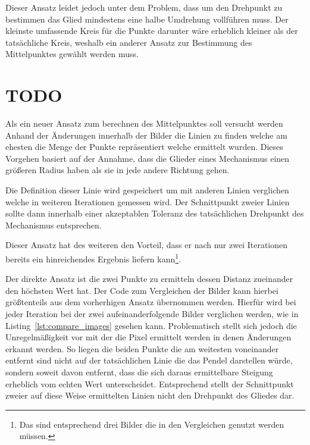 Dieser Ansatz leidet jedoch unter dem Problem, dass um den Drehpunkt zu bestimmen das Glied mindestens eine halbe Umdrehung vollführen muss.
Der kleinste umfassende Kreis für die Punkte darunter wäre erheblich kleiner als der tatsächliche Kreis, weshalb ein anderer Ansatz zur Bestimmung des Mittelpunktes gewählt werden muss.


\section{TODO} %

Als ein neuer Ansatz zum berechnen des Mittelpunktes soll versucht werden Anhand der Änderungen innerhalb der Bilder die Linien zu finden welche am ehesten die Menge der Punkte repräsentiert welche ermittelt wurden.
Dieses Vorgehen basiert auf der Annahme, dass die Glieder eines Mechanismus einen größeren Radius haben als sie in jede andere Richtung gehen.

Die Definition dieser Linie wird gespeichert um mit anderen Linien verglichen welche in weiteren Iterationen gemessen wird.
Der Schnittpunkt zweier Linien sollte dann innerhalb einer akzeptablen Toleranz des tatsächlichen Drehpunkt des Mechanismus entsprechen.

Dieser Ansatz hat des weiteren den Vorteil, dass er nach nur zwei Iterationen bereits ein hinreichendes Ergebnis liefern kann\footnote{Das sind entsprechend drei Bilder die in den Vergleichen genutzt werden müssen.}.

Der direkte Ansatz ist die zwei Punkte zu ermitteln dessen Distanz zueinander den höchsten Wert hat.
Der Code zum Vergleichen der Bilder kann hierbei größtenteils aus dem vorherhigen Ansatz übernommen werden.
Hierfür wird bei jeder Iteration bei der zwei aufeinanderfolgende Bilder verglichen werden, wie in Listing~\ref{lst:compare_images} gesehen kann.
Problematisch stellt sich jedoch die Unregelmäßigkeit vor mit der die Pixel ermittelt werden in denen Änderungen erkannt werden.
So liegen die beiden Punkte die am weitesten voneinander entfernt sind nicht auf der tatsächlichen Linie die das Pendel darstellen würde, sondern soweit davon entfernt, dass die sich daraus ermittelbare Steigung erheblich vom echten Wert unterscheidet.
Entsprechend stellt der Schnittpunkt zweier auf diese Weise ermittelten Linien nicht den Drehpunkt des Gliedes dar.

